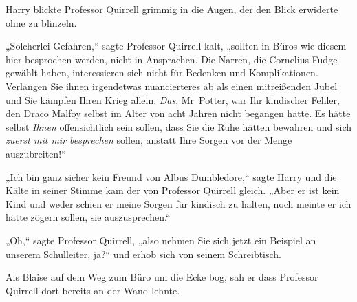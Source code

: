 Harry blickte Professor Quirrell grimmig in die Augen, der den Blick erwiderte ohne zu blinzeln.

„Solcherlei Gefahren,“ sagte Professor Quirrell kalt, „sollten in Büros wie diesem hier besprochen werden, nicht in Ansprachen. Die Narren, die Cornelius Fudge gewählt haben, interessieren sich nicht für Bedenken und Komplikationen. Verlangen Sie ihnen irgendetwas nuancierteres ab als einen mitreißenden Jubel und Sie kämpfen Ihren Krieg allein. \emph{Das}, Mr~Potter, war Ihr kindischer Fehler, den Draco Malfoy selbst im Alter von acht Jahren nicht begangen hätte. Es hätte selbst \emph{Ihnen} offensichtlich sein sollen, dass Sie die Ruhe hätten bewahren und sich \emph{zuerst mit mir besprechen} sollen, anstatt Ihre Sorgen vor der Menge auszubreiten!“

„Ich bin ganz sicher kein Freund von Albus Dumbledore,“ sagte Harry und die Kälte in seiner Stimme kam der von Professor Quirrell gleich. „Aber er ist kein Kind und weder schien er meine Sorgen für kindisch zu halten, noch meinte er ich hätte zögern sollen, sie auszusprechen.“

„Oh,“ sagte Professor Quirrell, „also nehmen Sie sich jetzt ein Beispiel an unserem Schulleiter, ja?“ und erhob sich von seinem Schreibtisch.

\later

Als Blaise auf dem Weg zum Büro um die Ecke bog, sah er dass Professor Quirrell dort bereits an der Wand lehnte.

